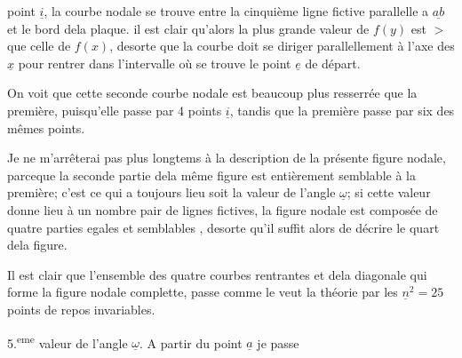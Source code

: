 \documentclass[11pt,a4paper]{article}
\begin{document}

point $\underline{i}$, la courbe nodale se trouve entre la cinquième ligne fictive
parallelle a $\underline{ab}$ et le bord dela plaque. il est clair qu'alors
la plus grande valeur de $f(y)$ est $>$ que celle de $f(x)$, desorte
que la courbe doit se diriger parallellement à l'axe
des $\underline{x}$ pour rentrer dans l'intervalle où se trouve le point
$\underline{e}$ de départ.

On voit que cette seconde courbe nodale est beaucoup
plus resserrée que la première, puisqu'elle  passe  par
4 points $\underline{i}$, tandis que la première passe  par six des
mêmes points.

Je ne m'arrêterai pas plus longtems à la description de
la présente figure nodale, parceque la seconde partie
dela même figure est  entièrement semblable à la première;
 c'est ce qui a toujours lieu   soit la valeur de
l'angle $\underline{\omega}$;   si cette valeur donne lieu à un nombre
pair de lignes fictives, la figure nodale est composée
de quatre parties egales et semblables , desorte qu'il suffit
alors de décrire le quart dela figure.

Il est clair que l'ensemble des quatre courbes rentrantes
et dela diagonale qui forme la figure nodale
complette, passe comme le veut la théorie par les
$\underline{n}^2 = 25$ points de repos invariables.

5.\textsuperscript{eme} valeur de l'angle $\underline{\omega}$. A partir du point $\underline{a}$ je passe
\end{document}
